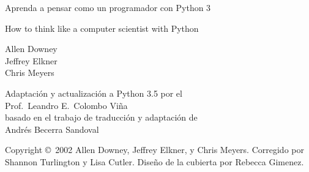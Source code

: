 \documentclass[a4paper, 11pt]{book}
\def\AutorPrefijo{Prof.}
\def\AutorNombre{Leandro E.}
\def\AutorApellido{Colombo Viña}
\def\AutorNombreCompleto{\AutorPrefijo\ \AutorNombre\ \AutorApellido}
\newcommand{\clearemptydoublepage}{\newpage{\pagestyle{empty}\cleardoublepage}}
\begin{document}
\frontmatter

\thispagestyle{empty}

\begin{flushright}
\vspace*{2.5in}
{\huge Aprenda a pensar como un programador}
\vspace{0.25in}
{\LARGE con Python 3}
\vfill
\end{flushright}

\clearemptydoublepage

\pagebreak
\thispagestyle{empty}

\begin{flushright}
\vspace*{2.5in}
{\huge How to think like a computer scientist}
\vspace{0.25in}
{\LARGE with Python}
\vspace{0.5in}
\author{Allen Downey, Jeffrey Elkner y Chris Meyers}

{\small
Allen Downey\\
Jeffrey Elkner\\
Chris Meyers\\
}

\vspace{.25in}

{\small
Adaptación y actualización a Python 3.5 por el\\
\AutorNombreCompleto\\
basado en el trabajo de traducción y adaptación de\\
Andrés Becerra Sandoval \\
}

\vspace{0.5in}
\vfill
\end{flushright}


\pagebreak
\thispagestyle{empty}
Copyright \copyright ~2002 Allen Downey, Jeffrey Elkner, y Chris Meyers.
\vspace{0.25in}
Corregido por Shannon Turlington y Lisa Cutler.
Diseño de la cubierta por Rebecca Gimenez.
\end{document}
